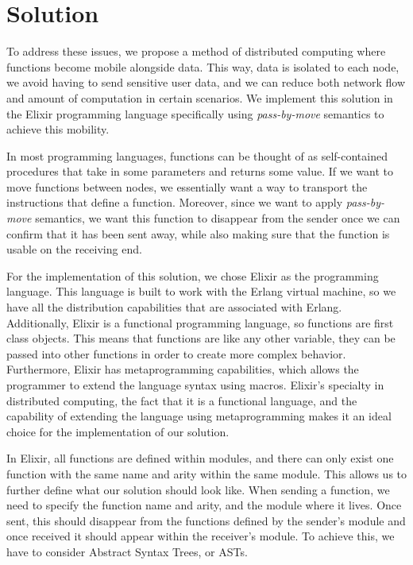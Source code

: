 
\chapter{Solution}
\label{cha:Solution}

To address these issues, we propose a method of distributed computing where functions become mobile alongside data. This way, data is isolated to each node, we avoid having to send sensitive user data, and we can reduce both network flow and amount of computation in certain scenarios. We implement this solution in the Elixir programming language specifically using \textit{pass-by-move} semantics to achieve this mobility.

In most programming languages, functions can be thought of as self-contained procedures that take in some parameters and returns some value. If we want to move functions between nodes, we essentially want a way to transport the instructions that define a function. Moreover, since we want to apply \textit{pass-by-move} semantics, we want this function to disappear from the sender once we can confirm that it has been sent away, while also making sure that the function is usable on the receiving end. 

For the implementation of this solution, we chose Elixir as the programming language. This language is built to work with the Erlang virtual machine, so we have all the distribution capabilities that are associated with Erlang. Additionally, Elixir is a functional programming language, so functions are first class objects. This means that functions are like any other variable, they can be passed into other functions in order to create more complex behavior. Furthermore, Elixir has metaprogramming capabilities, which allows the programmer to extend the language syntax using macros. Elixir's specialty in distributed computing, the fact that it is a functional language, and the capability of extending the language using metaprogramming makes it an ideal choice for the implementation of our solution.

In Elixir, all functions are defined within modules, and there can only exist one function with the same name and arity within the same module. This allows us to further define what our solution should look like. When sending a function, we need to specify the function name and arity, and the module where it lives. Once sent, this should disappear from the functions defined by the sender's module and once received it should appear within the receiver's module. To achieve this, we have to consider Abstract Syntax Trees, or ASTs. 

